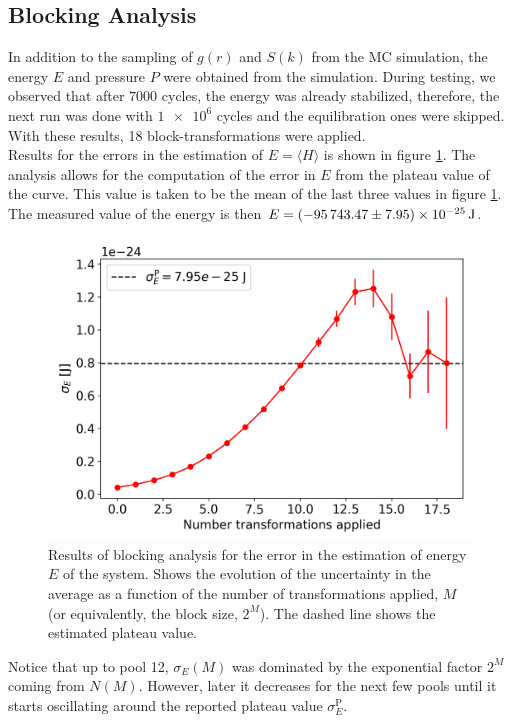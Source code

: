 \documentclass[%
aps,
pra,%
amsmath,amssymb,
preprint,%
reprint,%
notitlepage,
a4paper]{revtex4-1}
\newcommand{\average}[1]{\langle #1 \rangle}
\begin{document}
\subsection{Blocking Analysis}
In addition to the sampling of $g(r)$ and $S(k)$ from the MC simulation, the energy $E$ and pressure $P$ were obtained from the simulation. During testing, we observed that after $\num{7000}$ cycles, the energy was already stabilized, therefore, the next run was done with $\num{1e6}$ cycles and the equilibration ones were skipped. With these results, 18 block-transformations were applied.\\ Results for the errors in the estimation of $E = \average{H}$ is shown in figure \ref{fig:blockanalysis}. The analysis allows for the computation of the error in $E$ from the plateau value of the curve. This value is taken to be the mean of the last three values in figure \ref{fig:blockanalysis}. The measured value of the energy is then $E = \SI{-95743.47 \pm 7.95e-25}{\joule}$.\\
\begin{figure}
	\centering
	\includegraphics[width=0.999\linewidth]{../task2/results/block_analysis}
	\caption{Results of blocking analysis for the error in the estimation of energy $E$ of the system. Shows the evolution of the uncertainty in the average as a function of the number of transformations applied, $M$ (or equivalently, the block size, $2^M$). The dashed line shows the estimated plateau value.}
	\label{fig:blockanalysis}
\end{figure}
Notice that up to pool 12, $\sigma_E(M)$ was dominated by the exponential factor $2^M$ coming from $N(M)$. However, later it decreases for the next few pools until it starts oscillating around the reported plateau value $\sigma_E^\mathrm{P}$.
\end{document}
